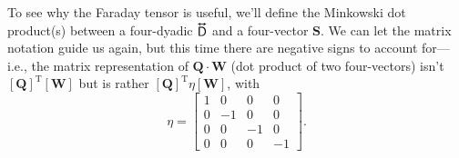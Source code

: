 \documentclass[12pt]{article}
\renewcommand{\vv}[1]{\mathbf{#1}}
\newcommand{\tightoverset}[2]{%
  \mathop{#2}\limits^{\vbox to -.5ex{\kern-0.75ex\hbox{$#1$}\vss}}}
\newcommand{\inlinedy}[1]{\tightoverset{\text{\tiny$\bm\leftrightarrow$}}{#1}}
\begin{document}
To see why the Faraday tensor is useful, we'll define the Minkowski dot product(s) between a four-dyadic $\inlinedy{\mathsf{D}}$ and a four-vector $\vv S$. We can let the matrix notation guide us again, but this time there are negative signs to account for---i.e., the matrix representation of $\vv Q \cdot \vv W$ (dot product of two four-vectors) isn't $[\vv Q]^{\textrm{T}} [\vv W]$ but is rather $[\vv Q]^{\textrm{T}} \eta [\vv W]$, with
\begin{equation}\label{eq:mmt}
\eta
=
\begin{bmatrix}
1 & 0 & 0 & 0 \\
0 & -1 & 0 & 0 \\
0 & 0 & -1 & 0 \\
0 & 0 & 0 & -1
\end{bmatrix} .
\end{equation}
\end{document}
